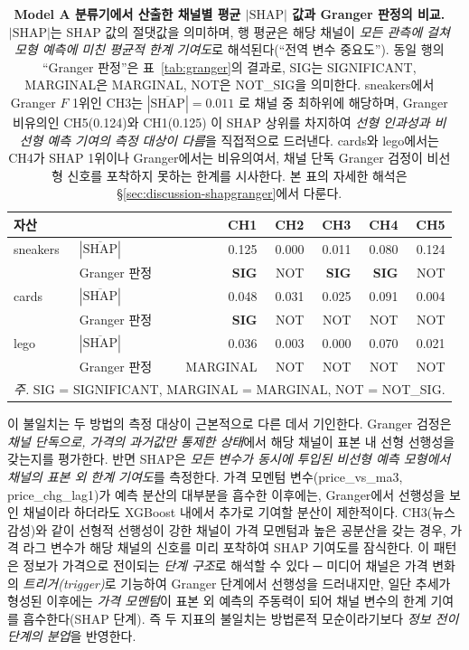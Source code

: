 \documentclass[11pt, a4paper, twocolumn]{article}
\begin{document}
\begin{table}[!tbp]
\centering\small
\caption[채널별 평균 $|\text{SHAP}|$]{\textbf{Model A 분류기에서 산출한
채널별 평균 $|\text{SHAP}|$ 값과 Granger 판정의 비교.} $|\text{SHAP}|$는
SHAP 값의 절댓값을 의미하며, 행 평균은 해당 채널이 \emph{모든 관측에
걸쳐 모형 예측에 미친 평균적 한계 기여도}로 해석된다(``전역 변수
중요도''). 동일 행의 ``Granger 판정''은 표~\ref{tab:granger}의 결과로,
SIG는 SIGNIFICANT, MARGINAL은 MARGINAL, NOT은 NOT\_SIG을 의미한다.
sneakers에서 Granger $F$ 1위인 CH3는 $|\overline{\text{SHAP}}|=0.011$
로 채널 중 최하위에 해당하며, Granger 비유의인 CH5(0.124)와 CH1(0.125)
이 SHAP 상위를 차지하여 \emph{선형 인과성과 비선형 예측 기여의 측정
대상이 다름}을 직접적으로 드러낸다. cards와 lego에서는 CH4가 SHAP
1위이나 Granger에서는 비유의여서, 채널 단독 Granger 검정이 비선형
신호를 포착하지 못하는 한계를 시사한다. 본 표의 자세한 해석은
\S\ref{sec:discussion-shapgranger}에서 다룬다.}
\label{tab:shap}
\begin{tabular}{llrrrrr}
\toprule
자산 & & CH1 & CH2 & CH3 & CH4 & CH5 \\
\midrule
sneakers & $|\overline{\text{SHAP}}|$ & 0.125 & 0.000 & 0.011 & 0.080 & 0.124 \\
         & Granger 판정 & \textbf{SIG} & NOT & \textbf{SIG} & \textbf{SIG} & NOT \\
\midrule
cards    & $|\overline{\text{SHAP}}|$ & 0.048 & 0.031 & 0.025 & 0.091 & 0.004 \\
         & Granger 판정 & \textbf{SIG} & NOT & NOT & NOT & NOT \\
\midrule
lego     & $|\overline{\text{SHAP}}|$ & 0.036 & 0.003 & 0.000 & 0.070 & 0.021 \\
         & Granger 판정 & MARGINAL & NOT & NOT & NOT & NOT \\
\bottomrule
\multicolumn{7}{l}{\textit{주.} SIG = SIGNIFICANT, MARGINAL = MARGINAL, NOT = NOT\_SIG.}
\end{tabular}
\end{table}

이 불일치는 두 방법의 측정 대상이 근본적으로 다른 데서 기인한다.
Granger 검정은 \emph{채널 단독으로, 가격의 과거값만 통제한 상태}에서
해당 채널이 표본 내 선형 선행성을 갖는지를 평가한다. 반면 SHAP은
\emph{모든 변수가 동시에 투입된 비선형 예측 모형에서 채널의 표본 외 한계
기여도}를 측정한다. 가격 모멘텀 변수(\textsf{price\_vs\_ma3},
\textsf{price\_chg\_lag1})가 예측 분산의 대부분을 흡수한 이후에는,
Granger에서 선행성을 보인 채널이라 하더라도 XGBoost 내에서 추가로 기여할
분산이 제한적이다. CH3(뉴스 감성)와 같이 선형적 선행성이 강한 채널이 가격
모멘텀과 높은 공분산을 갖는 경우, 가격 라그 변수가 해당 채널의 신호를
미리 포착하여 SHAP 기여도를 잠식한다. 이 패턴은 정보가 가격으로 전이되는
\emph{단계 구조}로 해석할 수 있다 ─ 미디어 채널은 가격 변화의
\emph{트리거(trigger)}로 기능하여 Granger 단계에서 선행성을 드러내지만,
일단 추세가 형성된 이후에는 \emph{가격 모멘텀}이 표본 외 예측의 주동력이
되어 채널 변수의 한계 기여를 흡수한다(SHAP 단계). 즉 두 지표의 불일치는
방법론적 모순이라기보다 \emph{정보 전이 단계의 분업}을 반영한다.
\end{document}
